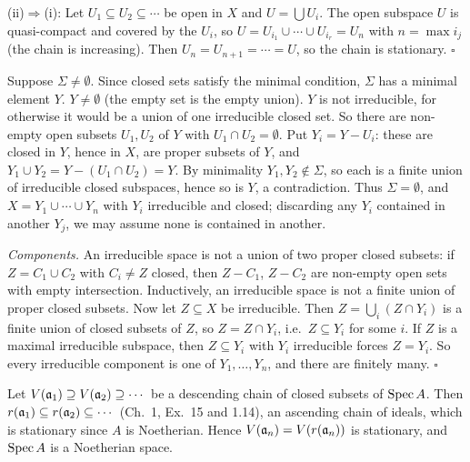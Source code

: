 \documentclass[11pt]{article}
\begin{document}
(ii)$\Rightarrow$(i): Let $U_1\subseteq U_2\subseteq\cdots$ be open in $X$ and $U=\bigcup U_i$. The open subspace $U$ is quasi-compact and covered by the $U_i$, so $U=U_{i_1}\cup\cdots\cup U_{i_r}=U_n$ with $n=\max i_j$ (the chain is increasing). Then $U_n=U_{n+1}=\cdots=U$, so the chain is stationary. \hfill$\square$

\pf
Suppose $\Sigma\ne\emptyset$. Since closed sets satisfy the minimal condition, $\Sigma$ has a minimal element $Y$. $Y\ne\emptyset$ (the empty set is the empty union). $Y$ is not irreducible, for otherwise it would be a union of one irreducible closed set. So there are non-empty open subsets $U_1,U_2$ of $Y$ with $U_1\cap U_2=\emptyset$. Put $Y_i=Y-U_i$: these are closed in $Y$, hence in $X$, are proper subsets of $Y$, and $Y_1\cup Y_2=Y-(U_1\cap U_2)=Y$. By minimality $Y_1,Y_2\notin\Sigma$, so each is a finite union of irreducible closed subspaces, hence so is $Y$, a contradiction. Thus $\Sigma=\emptyset$, and $X=Y_1\cup\cdots\cup Y_n$ with $Y_i$ irreducible and closed; discarding any $Y_i$ contained in another $Y_j$, we may assume none is contained in another.

\emph{Components.} An irreducible space is not a union of two proper closed subsets: if $Z=C_1\cup C_2$ with $C_i\ne Z$ closed, then $Z-C_1$, $Z-C_2$ are non-empty open sets with empty intersection. Inductively, an irreducible space is not a finite union of proper closed subsets. Now let $Z\subseteq X$ be irreducible. Then $Z=\bigcup_i(Z\cap Y_i)$ is a finite union of closed subsets of $Z$, so $Z=Z\cap Y_i$, i.e.\ $Z\subseteq Y_i$ for some $i$. If $Z$ is a maximal irreducible subspace, then $Z\subseteq Y_i$ with $Y_i$ irreducible forces $Z=Y_i$. So every irreducible component is one of $Y_1,\dots,Y_n$, and there are finitely many. \hfill$\square$

\pf
Let $V(\mathfrak a_1)\supseteq V(\mathfrak a_2)\supseteq\cdots$ be a descending chain of closed subsets of $\operatorname{Spec} A$. Then $r(\mathfrak a_1)\subseteq r(\mathfrak a_2)\subseteq\cdots$ (Ch.~1, Ex.~15 and 1.14), an ascending chain of ideals, which is stationary since $A$ is Noetherian. Hence $V(\mathfrak a_n)=V(r(\mathfrak a_n))$ is stationary, and $\operatorname{Spec} A$ is a Noetherian space.
\end{document}
